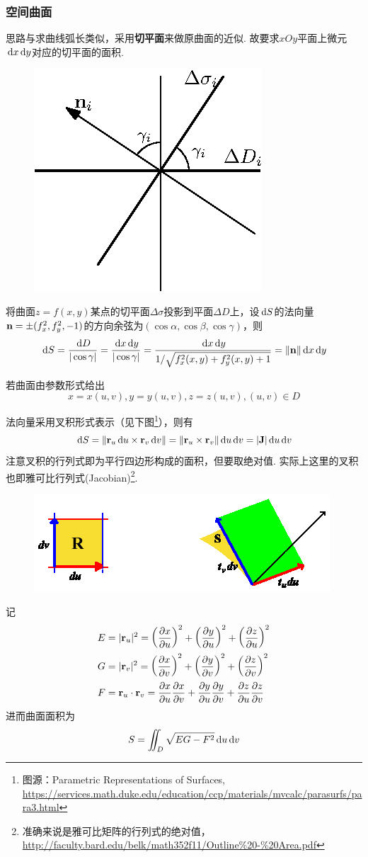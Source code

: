 \subsubsection{空间曲面}
\label{subsubsec:surface_area}
思路与求曲线弧长类似，采用\textbf{切平面}来做原曲面的近似.
故要求$xOy$平面上微元$\,\mathrm{d} x\,\mathrm{d} y$对应的切平面的面积.
\begin{figure}[H]
\centering
\includegraphics[width=0.2\linewidth]{fig/surface_projection.eps}
\end{figure}
\par 将曲面$z=f(x,y)$某点的切平面$\Delta\sigma$投影到平面$\Delta D$上，设$\,\mathrm{d} S$的法向量$\mathbf{n}=\pm(f^2_x,f^2_y,-1)$的方向余弦为$(\cos\alpha,\cos\beta,\cos\gamma)$，则
\[\,\mathrm{d} S=\frac{\,\mathrm{d} D}{|\cos\gamma|}=\frac{\,\mathrm{d} x\,\mathrm{d} y}{|\cos\gamma|}=\frac{\,\mathrm{d} x\,\mathrm{d} y}{1/\sqrt{f^2_x(x,y)+f^2_y(x,y)+1}}=\|\mathbf{n}\|\,\mathrm{d} x\,\mathrm{d} y\]
\par 若曲面由参数形式给出
\[x=x(u,v),y=y(u,v),z=z(u,v),(u,v)\in D\]
\par 法向量采用叉积形式表示（见下图\footnote{图源：Parametric Representations of Surfaces, \url{https://services.math.duke.edu/education/ccp/materials/mvcalc/parasurfs/para3.html}}），则有
\[\,\mathrm{d} S=\|\mathbf{r}_u\,\mathrm{d} u\times\mathbf{r}_v\,\mathrm{d} v\|=\|\mathbf{r}_u\times\mathbf{r}_v\|\,\mathrm{d} u\,\mathrm{d} v=|\mathbf{J}|\,\mathrm{d} u\,\mathrm{d} v\]
注意叉积的行列式即为平行四边形构成的面积，但要取绝对值.
实际上这里的叉积也即雅可比行列式(Jacobian)\footnote{准确来说是雅可比矩阵的行列式的绝对值，\url{http://faculty.bard.edu/belk/math352f11/Outline\%20-\%20Area.pdf}}.
\begin{figure}[H]
\centering
\includegraphics[width=0.4\linewidth]{fig/coordinate_projection2.png}
\end{figure}
记
\[\begin{aligned}
E&=|\mathbf{r}_u|^2=\left(\dfrac{\partial x}{\partial u}\right)^2+\left(\dfrac{\partial y}{\partial u}\right)^2+\left(\dfrac{\partial z}{\partial u}\right)^2\\
G&=|\mathbf{r}_v|^2=\left(\dfrac{\partial x}{\partial v}\right)^2+\left(\dfrac{\partial y}{\partial v}\right)^2+\left(\dfrac{\partial z}{\partial v}\right)^2\\
F&=\mathbf{r}_u\cdot\mathbf{r}_v=\dfrac{\partial x}{\partial u}\dfrac{\partial x}{\partial v}+\dfrac{\partial y}{\partial u}\dfrac{\partial y}{\partial v}+\dfrac{\partial z}{\partial u}\dfrac{\partial z}{\partial v}
\end{aligned}\]
进而曲面面积为
\[S=\iint_D\sqrt{EG-F^2}\,\mathrm{d} u\,\mathrm{d} v\]

